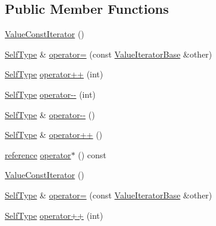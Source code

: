 \subsection*{Public Member Functions}
\begin{DoxyCompactItemize}
\item 
\hyperlink{classJson_1_1ValueConstIterator_a1b10a46f1606421b0663492a5f9a2aad}{Value\-Const\-Iterator} ()
\item 
\hyperlink{classJson_1_1ValueIteratorBase_a9d2a940d03ea06d20d972f41a89149ee}{Self\-Type} \& \hyperlink{classJson_1_1ValueConstIterator_afca9f2ee621a4a47f3e61d6144ce3d0c}{operator=} (const \hyperlink{classJson_1_1ValueIteratorBase}{Value\-Iterator\-Base} \&other)
\item 
\hyperlink{classJson_1_1ValueIteratorBase_a9d2a940d03ea06d20d972f41a89149ee}{Self\-Type} \hyperlink{classJson_1_1ValueConstIterator_ab3f0c2edbfc8f7d60645f3d597d05e28}{operator++} (int)
\item 
\hyperlink{classJson_1_1ValueIteratorBase_a9d2a940d03ea06d20d972f41a89149ee}{Self\-Type} \hyperlink{classJson_1_1ValueConstIterator_a94935961e9331c6f7b907b05ec8df75e}{operator-\/-\/} (int)
\item 
\hyperlink{classJson_1_1ValueIteratorBase_a9d2a940d03ea06d20d972f41a89149ee}{Self\-Type} \& \hyperlink{classJson_1_1ValueConstIterator_a31415e44e44e56fb2bfda7e8bb784646}{operator-\/-\/} ()
\item 
\hyperlink{classJson_1_1ValueIteratorBase_a9d2a940d03ea06d20d972f41a89149ee}{Self\-Type} \& \hyperlink{classJson_1_1ValueConstIterator_a2cfe2f7a94a688186efdafb1b181c319}{operator++} ()
\item 
\hyperlink{classJson_1_1ValueConstIterator_aa9b05c6a37cd352ea1ee6e13b816f709}{reference} \hyperlink{classJson_1_1ValueConstIterator_aeb44153d71c61ac9397a84d5ecc244c5}{operator$\ast$} () const 
\item 
\hyperlink{classJson_1_1ValueConstIterator_a1b10a46f1606421b0663492a5f9a2aad}{Value\-Const\-Iterator} ()
\item 
\hyperlink{classJson_1_1ValueIteratorBase_a9d2a940d03ea06d20d972f41a89149ee}{Self\-Type} \& \hyperlink{classJson_1_1ValueConstIterator_afca9f2ee621a4a47f3e61d6144ce3d0c}{operator=} (const \hyperlink{classJson_1_1ValueIteratorBase}{Value\-Iterator\-Base} \&other)
\item 
\hyperlink{classJson_1_1ValueIteratorBase_a9d2a940d03ea06d20d972f41a89149ee}{Self\-Type} \hyperlink{classJson_1_1ValueConstIterator_ab3f0c2edbfc8f7d60645f3d597d05e28}{operator++} (int)
\item 

\end{DoxyCompactItemize}
